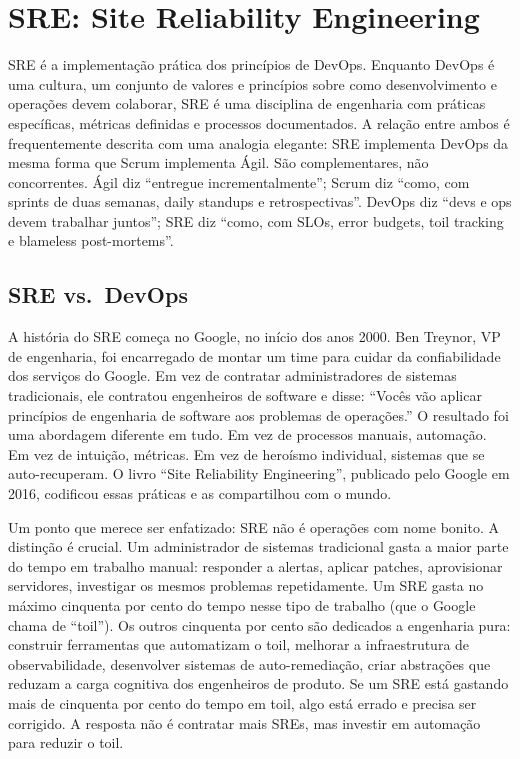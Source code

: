 \section{SRE: Site Reliability Engineering}

SRE é a implementação prática dos princípios de DevOps. Enquanto DevOps é uma
cultura, um conjunto de valores e princípios sobre como desenvolvimento e
operações devem colaborar, SRE é uma disciplina de engenharia com práticas
específicas, métricas definidas e processos documentados. A relação entre ambos
é frequentemente descrita com uma analogia elegante: SRE implementa DevOps da
mesma forma que Scrum implementa Ágil. São complementares, não concorrentes. Ágil
diz ``entregue incrementalmente''; Scrum diz ``como, com sprints de duas semanas,
daily standups e retrospectivas''. DevOps diz ``devs e ops devem trabalhar juntos'';
SRE diz ``como, com SLOs, error budgets, toil tracking e blameless post-mortems''.

\subsection{SRE vs.\ DevOps}

A história do SRE começa no Google, no início dos anos 2000. Ben Treynor, VP de
engenharia, foi encarregado de montar um time para cuidar da confiabilidade dos
serviços do Google. Em vez de contratar administradores de sistemas tradicionais,
ele contratou engenheiros de software e disse: ``Vocês vão aplicar princípios de
engenharia de software aos problemas de operações.'' O resultado foi uma
abordagem diferente em tudo. Em vez de processos manuais, automação.
Em vez de intuição, métricas. Em vez de heroísmo individual, sistemas que se
auto-recuperam. O livro ``Site Reliability Engineering'', publicado pelo Google
em 2016, codificou essas práticas e as compartilhou com o mundo.

Um ponto que merece ser enfatizado: SRE não é operações com nome bonito. A
distinção é crucial. Um administrador de sistemas tradicional gasta a maior parte
do tempo em trabalho manual: responder a alertas, aplicar patches, aprovisionar
servidores, investigar os mesmos problemas repetidamente. Um SRE gasta no
máximo cinquenta por cento do tempo nesse tipo de trabalho (que o Google chama
de ``toil''). Os outros cinquenta por cento são dedicados a engenharia pura:
construir ferramentas que automatizam o toil, melhorar a infraestrutura de
observabilidade, desenvolver sistemas de auto-remediação, criar abstrações que
reduzam a carga cognitiva dos engenheiros de produto. Se um SRE está gastando
mais de cinquenta por cento do tempo em toil, algo está errado e precisa ser
corrigido. A resposta não é contratar mais SREs, mas investir em automação para
reduzir o toil.

